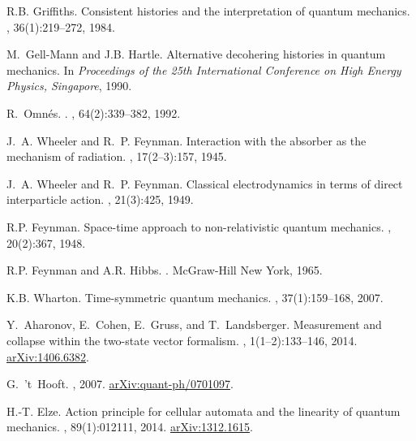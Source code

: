 \documentclass[11pt]{amsart}
\theoremstyle{definition}
\theoremstyle{plain}
\begin{document}
\begin{thebibliography}{10}
R.B. Griffiths.
\newblock Consistent histories and the interpretation of quantum mechanics.
, 36(1):219--272, 1984.

M.~Gell-Mann and J.B. Hartle.
\newblock Alternative decohering histories in quantum mechanics.
\newblock In {\em Proceedings of the 25th International Conference on High
  Energy Physics, Singapore}, 1990.

R.~Omn\'es.
.
, 64(2):339--382, 1992.

J.~A. Wheeler and R.~P. Feynman.
\newblock Interaction with the absorber as the mechanism of radiation.
, 17(2--3):157, 1945.

J.~A. Wheeler and R.~P. Feynman.
\newblock Classical electrodynamics in terms of direct interparticle action.
, 21(3):425, 1949.

R.P. Feynman.
\newblock Space-time approach to non-relativistic quantum mechanics.
, 20(2):367, 1948.

R.P. Feynman and A.R. Hibbs.
.
\newblock McGraw-Hill New York, 1965.

K.B. Wharton.
\newblock Time-symmetric quantum mechanics.
, 37(1):159--168, 2007.

Y.~Aharonov, E.~Cohen, E.~Gruss, and T.~Landsberger.
\newblock Measurement and collapse within the two-state vector formalism.
, 1(1--2):133--146, 2014.
\newblock \href{http://arxiv.org/abs/1406.6382}{arXiv:1406.6382}.

G.~'t~Hooft.
, 2007.
\newblock \href{http://arxiv.org/abs/quant-ph/0701097}{arXiv:quant-ph/0701097}.

H.-T. Elze.
\newblock Action principle for cellular automata and the linearity of quantum
  mechanics.
, 89(1):012111, 2014.
\newblock \href{http://arxiv.org/abs/1312.1615}{arXiv:1312.1615}.


\end{thebibliography}
\end{document}
